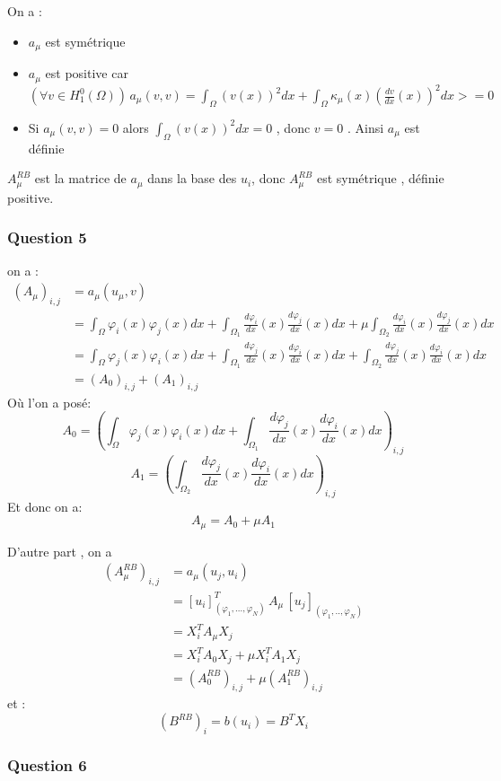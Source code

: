 \documentclass{article}
\newcommand{\DDeriv}[1]{\ensuremath{\frac{d#1}{dx}}}
\newcommand{\Q}[1]{\subsubsection*{Question #1}}
\begin{document}
On a : 
\begin{itemize}
	\item $a_{\mu}$ est symétrique 
	\item $a_\mu$ est positive car $(\forall v \in H^0_1(\Omega)) \, a_{\mu}(v,v) = \int_{\Omega}  (v(x))^{2}dx  +   \int_{\Omega}  \kappa_{\mu}(x) (\DDeriv{v}(x))^{2}  dx >= 0$ 
	\item Si $  a_{\mu}(v,v) = 0 $ alors $ \int_{\Omega}  (v(x))^{2}dx = 0 $ , donc $v=0$ . Ainsi $ a_{\mu} $ est définie 
\end{itemize}
$ A_{\mu}^{RB} $ est la matrice de $a_\mu$ dans la base des $u_i$, donc $ A_{\mu}^{RB} $ est symétrique , définie positive.


\Q{5}
on a : 
\begin{align*}
(A_{\mu})_{i,j} &= a_{\mu}(u_{\mu},v) \\
&= \int_{\Omega}  \varphi_i(x) \varphi_j(x)dx  +   \int_{\Omega_{1}} \DDeriv{\varphi_i}(x) \DDeriv{\varphi_j}(x) dx  +  \mu \int_{\Omega_{2}} \DDeriv{\varphi_i}(x) \DDeriv{\varphi_j}(x) dx \\
&= \int_{\Omega} \varphi_{j}(x) \varphi_{i}(x)dx  +   \int_{\Omega_{1}} \DDeriv{\varphi_{j}}(x) \DDeriv{\varphi_{i}}(x) dx 
+ \int_{\Omega_{2}} \DDeriv{\varphi_{j}}(x) \DDeriv{\varphi_{i}}(x) dx \\
&= (A_{0})_{i,j} + (A_{1})_{i,j}
\end{align*}
Où l'on a posé:
$$ A_{0} = \left(\int_{\Omega} \varphi_{j}(x) \varphi_{i}(x)dx  +   \int_{\Omega_{1}} \DDeriv{\varphi_{j}}(x) \DDeriv{\varphi_{i}}(x) dx\right)_{i, j} $$
$$ A_{1} = \left(\int_{\Omega_{2}} \DDeriv{\varphi_{j}}(x) \DDeriv{\varphi_{i}}(x) dx\right)_{i, j} $$
Et donc on a: $$ A_{\mu} = A_{0} + \mu A_{1} $$


D'autre part , on a 
\begin{align*}
(A_{\mu}^{RB})_{i,j} &= a_{\mu}(u_{j},u_{i}) \\
&= [u_{i}]_{(\varphi_{1},...,\varphi_{N})}^T \, A_\mu \, [u_{j}]_{(\varphi_{1},..,\varphi_{N})} \\
&= X_i^T A_\mu X_j \\
&= X_i^T A_0 X_j + \mu X_i^T A_1 X_j \\
&= (A_0^{RB})_{i,j} + \mu (A_1^{RB})_{i,j}
\end{align*}
et :
$$ (B^{RB})_{i} = b(u_{i}) = B^T X_i $$


\Q{6}
\end{document}
